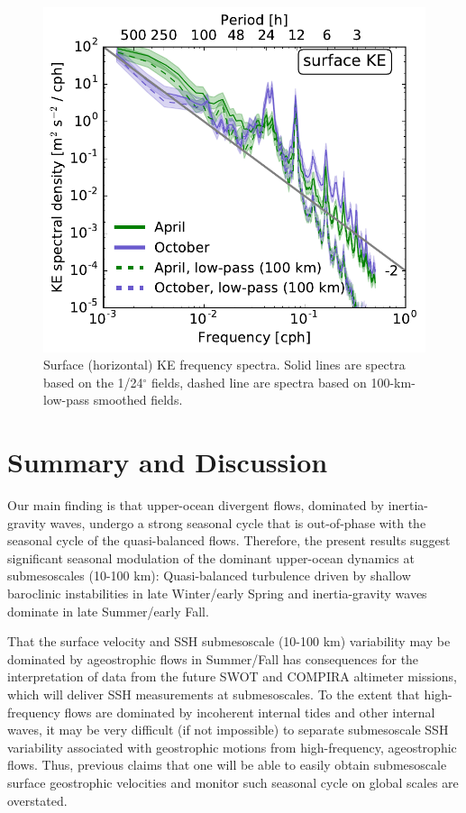 \documentclass[grl]{agutex2015}
\begin{document}
\begin{article}

\begin{figure}[ht]
  \begin{center}
    \includegraphics[width=.45\textwidth]{figs/fig4.pdf}
 \caption{Surface (horizontal) KE frequency spectra. Solid lines
 are spectra based on the 1/24$^\circ$ fields, dashed line are spectra
 based on 100-km-low-pass smoothed fields.}
 \label{fig4}
 \end{center}
\end{figure}



\section{Summary and Discussion}
Our main finding is that
upper-ocean divergent flows, dominated by inertia-gravity waves, undergo
a strong seasonal cycle that is out-of-phase with the seasonal cycle of
the quasi-balanced flows. Therefore, the present results suggest significant
seasonal modulation of the dominant upper-ocean dynamics at submesoscales
(10-100 km): Quasi-balanced turbulence driven by shallow baroclinic instabilities
 in late Winter/early Spring
and inertia-gravity waves dominate in late Summer/early Fall.

That the surface velocity and SSH submesoscale (10-100 km) variability may be
dominated by ageostrophic flows in
Summer/Fall has consequences for the interpretation of data from
the future SWOT and COMPIRA altimeter missions,
which will deliver SSH measurements at submesoscales. To the extent that
high-frequency flows are dominated by incoherent internal tides and other
internal waves, it may be very difficult (if not impossible) to
separate submesoscale SSH variability associated with geostrophic motions
from high-frequency, ageostrophic flows. Thus, previous claims that
one will be able to easily obtain submesoscale surface
geostrophic velocities and monitor such seasonal cycle on global scales
\citep{sasaki_etal2014,qiu_etal2014} are overstated.


\end{article}
\end{document}
